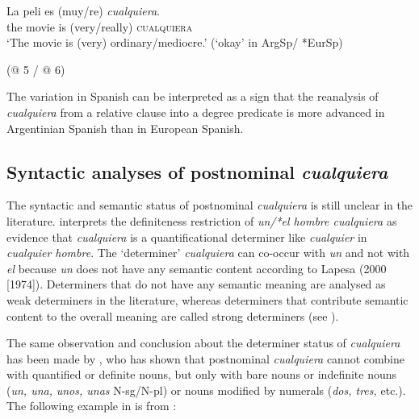 \ea \label{ex:key:50} %
  \gll La peli es (muy/re) \textit{cualquiera}.\\
the movie is (very/really) \textsc{cualquiera}\\
\glt ‘The movie is (very) ordinary/mediocre.’  (‘okay’ in ArgSp/ *EurSp)

  (@ 5 / @ 6)
\z

The variation in Spanish can be interpreted as a sign that the reanalysis of \textit{cualquiera} from a relative clause into a degree predicate is more advanced in Argentinian Spanish than in European Spanish.

\subsection{{Syntactic} {analyses} {of} {postnominal} {\textit{cualquiera}}} \label{sec:2.1.3}

\hspace*{-.6pt}The syntactic and semantic status of postnominal \textit{cualquiera} is still unclear in the literature. \citet{Lapesa2000[1974]} interprets the definiteness restriction of \textit{un/*el hombre cualquiera} as evidence that \textit{cualquiera} is a quantificational determiner like \textit{cualquier} in \textit{cualquier hombre}. The ‘determiner’ \textit{cualquiera} can co-occur with \textit{un} and not with \textit{el} because \textit{un} does not have any semantic content according to Lapesa (2000 [1974]). Determiners that do not have any semantic meaning are analysed as weak determiners in the literature, whereas determiners that contribute semantic content to the overall meaning are called strong determiners (see \citealt{Zamparelli2000}).

The same observation and conclusion about the determiner status of \textit{cualquiera} has been made by \citet{Rivero2011}, who has shown that postnominal \textit{cualquiera} cannot combine with quantified or definite nouns, but only with bare nouns or indefinite nouns (\textit{un, una,} \textit{unos, unas} N-sg/N-pl) or nouns modified by numerals (\textit{dos, tres,} etc.). The following example in  is from \citet[72]{Rivero2011}:

